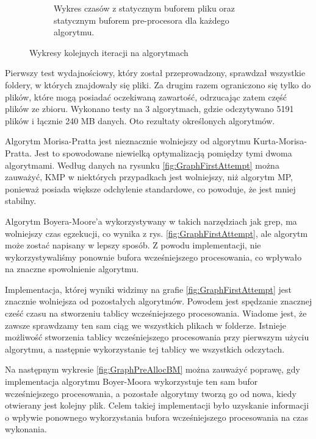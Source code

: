\begin{figure}
\begin{subfigure}{0.8\textwidth}
    \caption{Wykres czasów z statycznym buforem pliku oraz statycznym buforem
    pre-procesora dla każdego algorytmu.}
    \label{fig:GraphStaticPreallocAndFileBuffer}
\end{subfigure}
\caption{Wykresy kolejnych iteracji na algorytmach}
\label{fig:GraphsIterationComparison}
\end{figure}

Pierwszy test wydajnościowy, który został przeprowadzony, sprawdzał wszystkie 
foldery, w których znajdowały się pliki. Za drugim razem ograniczono się tylko
do plików, które mogą posiadać oczekiwaną zawartość, odrzucając zatem część 
plików ze zbioru. Wykonano testy na 3 algorytmach, gdzie odczytywano 5191 plików 
i łącznie 240 MB danych. Oto rezultaty określonych algorytmów.

Algorytm Morisa-Pratta jest nieznacznie wolniejszy od algorytmu 
Kurta-Morisa-Pratta. Jest to spowodowane niewielką optymalizacją pomiędzy tymi 
dwoma algorytmami. Według danych na rysunku \ref{fig:GraphFirstAttempt} można 
zauważyć, KMP w niektórych przypadkach jest wolniejszy, niż algorytm MP, 
ponieważ posiada większe odchylenie standardowe, co powoduje, że jest mniej
stabilny. 



Algorytm Boyera-Moore'a wykorzystywany w takich narzędziach jak grep, ma 
wolniejszy czas egzekucji, co wynika z rys. \ref{fig:GraphFirstAttempt}, ale 
algorytm może zostać napisany w lepszy sposób. Z powodu implementacji, nie 
wykorzystywaliśmy ponownie bufora wcześniejszego procesowania, co wpływało na znaczne
spowolnienie algorytmu.

Implementacja, której wyniki widzimy na grafie \ref{fig:GraphFirstAttempt} jest
znacznie wolniejsza od pozostałych algorytmów. Powodem jest spędzanie znacznej
cześć czasu na stworzeniu tablicy wcześniejszego procesowania. Wiadome jest, że zawsze 
sprawdzamy ten sam ciąg we wszystkich plikach w folderze. Istnieje możliwość 
stworzenia tablicy wcześniejszego procesowania przy pierwszym użyciu algorytmu, a następnie
wykorzystanie tej tablicy we wszystkich odczytach.

Na następnym wykresie \ref{fig:GraphPreAllocBM} można zauważyć poprawę, gdy
implementacja algorytmu Boyer-Moora wykorzystuje ten sam bufor wcześniejszego procesowania, a
pozostałe algorytmy tworzą go od nowa, kiedy otwierany jest kolejny plik. Celem 
takiej implementacji było uzyskanie informacji o wpływie ponownego wykorzystania
bufora wcześniejszego procesowania na czas wykonania. 


